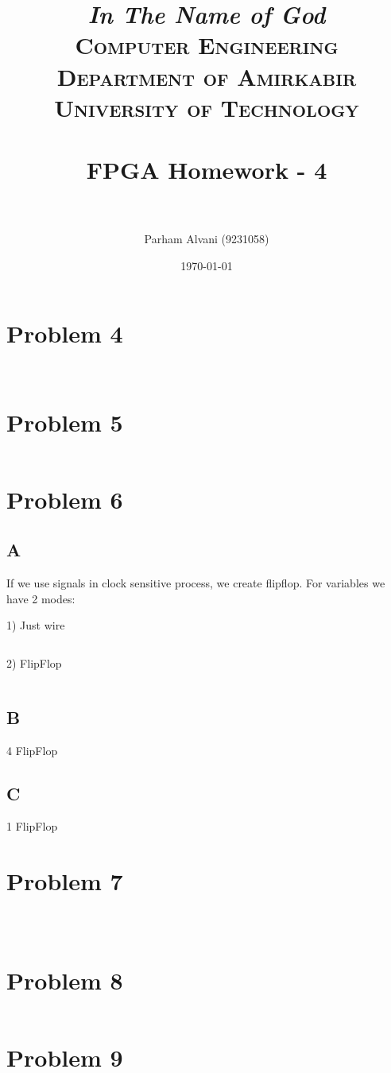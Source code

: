 \documentclass[paper=a4, fontsize=11pt]{scrartcl} %
\title{
\normalfont \normalsize
\textit{In The Name of God} \\
\textsc{Computer Engineering Department of Amirkabir University of Technology} \\ [25pt]
\horrule{0.5pt} \\[0.4cm] %
\huge FPGA Homework - 4 \\ %
\horrule{2pt} \\[0.5cm] %
}
\author{Parham Alvani (9231058)}
\date{\normalsize\today}
\numberwithin{equation}{section} %
\numberwithin{figure}{section} %
\numberwithin{table}{section} %
\begin{document}
\maketitle


\section{Problem 4}
\inputminted{vhdl}{src/p4/p4-1.vhd}
\inputminted{vhdl}{src/p4/p4-2.vhd}


\section{Problem 5}
\inputminted{vhdl}{src/p5/p5.vhd}


\section{Problem 6}
\subsection{A}
\par If we use signals in clock sensitive process, we create flipflop.
For variables we have 2 modes:
\par 1) Just wire
\inputminted{vhdl}{src/p6/p6-1-1.vhd}
\par 2) FlipFlop
\inputminted{vhdl}{src/p6/p6-1-2.vhd}
\subsection{B}
4 FlipFlop
\subsection{C}
1 FlipFlop


\section{Problem 7}
\inputminted{vhdl}{src/p7/p7.vhd}
\inputminted{vhdl}{src/p7/d-flipflop.vhd}
\inputminted{vhdl}{src/p7/ring-counter.vhd}


\section{Problem 8}
\inputminted{vhdl}{src/p8/p8.vhd}


\section{Problem 9}
\inputminted{vhdl}{src/p9/vending-machine.vhd}
\inputminted{text}{src/p9/vending_machine_utilization_synth_area.rpt}
\inputminted{text}{src/p9/vending_machine_utilization_synth_performance.rpt}
\end{document}
